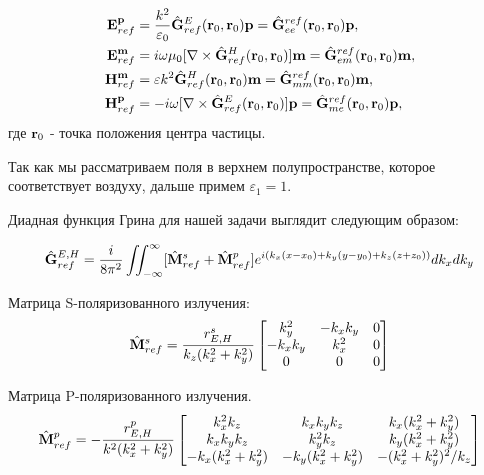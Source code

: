 \begin{align}
    \vb{E}_{ref}^{\vb{p}} &= \frac{ k^2}{\varepsilon_0} \hat{\vb{G}}_{ref}^E (\vb{r}_0, \vb{r}_0) \vb{p} = \hat{\vb{G}}^{ref}_{ee} (\vb{r}_0, \vb{r}_0) \vb{p},\\
    \vb{E}_{ref}^{\vb{m}} &= i\omega  \mu_0 [\nabla \times \hat{\vb{G}}_{ref}^H (\vb{r}_0, \vb{r}_0) ]\vb{m} = \hat{\vb{G}}^{ref}_{em} (\vb{r}_0, \vb{r}_0)\vb{m},\\
    \vb{H}_{ref}^{\vb{m}} &=\varepsilon  k^2 \hat{\vb{G}}_{ref}^H (\vb{r}_0, \vb{r}_0) \vb{m} = \hat{\vb{G}}^{ref}_{mm}(\vb{r}_0, \vb{r}_0) \vb{m},\\
    \vb{H}_{ref}^{\vb{p}} &= - i\omega [\nabla \times \hat{\vb{G}}_{ref}^E (\vb{r}_0, \vb{r}_0) ]\vb{p} =  \hat{\vb{G}}^{ref}_{me}(\vb{r}_0, \vb{r}_0) \vb{p},
\end{align}
где $\vb{r}_0$ - точка положения центра частицы.

Так как мы рассматриваем поля в верхнем полупространстве, которое соответствует воздуху, дальше примем $\varepsilon_1=1$.

Диадная функция Грина для нашей задачи выглядит следующим образом:


\begin{equation}
    \hat{\vb{G}}_{ref}^{E,H} = \frac{i}{8 \pi^2} \iint ^{\infty}_{-\infty} [ \hat{\vb{M}}^{s}_{ref} + \hat{\vb{M}}_{ref}^{p}] e^{i(k_x (x-x_0) + k_y(y-y_0) + k_z (z+z_0))} dk_x dk_y \label{eq:green_func}
\end{equation}

Матрица S-поляризованного излучения:
\begin{equation}
    \hat{\vb{M}}_{ref}^{s} = \frac{r^s_{E,H}}{k_z (k_x^2+k_y^2)}\begin{bmatrix}
        k_y^2 & -k_x k_y & 0 \\
        -k_x k_y & k_x^2 & 0 \\
         0 & 0 & 0\\
    \end{bmatrix}\label{eq:s-pol-m-green}
\end{equation}

Матрица P-поляризованного излучения. 
\begin{equation}
    \hat{\vb{M}}_{ref}^{p} = -\frac{r^p_{E,H}}{k^2 (k_x^2+k_y^2)}\begin{bmatrix}
        k_x^2 k_z & k_x k_y k_z & k_x (k_x^2+k_y^2) \\
        k_x k_y k_z & k_y^2 k_z & k_y (k_x^2+k_y^2) \\
        -k_x (k_x^2+k_y^2) & -k_y (k_x^2+k_y^2) & -(k_x^2+k_y^2)^2/k_z\\
    \end{bmatrix}\label{eq:p-pol-m-green}
\end{equation}

